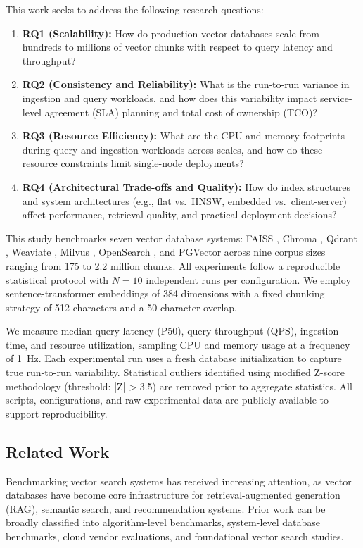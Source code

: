 \documentclass{article}
\begin{document}
This work seeks to address the following research questions:
\begin{enumerate}
    \item \textbf{RQ1 (Scalability):} How do production vector databases scale from hundreds to millions of vector chunks with respect to query latency and throughput?    
    \item \textbf{RQ2 (Consistency and Reliability):} What is the run-to-run variance in ingestion and query workloads, and how does this variability impact service-level agreement (SLA) planning and total cost of ownership (TCO)?    
    \item \textbf{RQ3 (Resource Efficiency):} What are the CPU and memory footprints during query and ingestion workloads across scales, and how do these resource constraints limit single-node deployments?    
    \item \textbf{RQ4 (Architectural Trade-offs and Quality):} How do index structures and system architectures (e.g., flat vs.\ HNSW, embedded vs.\ client-server) affect performance, retrieval quality, and practical deployment decisions?
\end{enumerate}
This study benchmarks seven vector database systems: FAISS \cite{faiss_}, Chroma \cite{chromadb}, Qdrant \cite{qdrant}, Weaviate \cite{weaviate}, Milvus \cite{milvus}, OpenSearch \cite{opensearch}, and PGVector \cite{pgvector} across nine corpus sizes ranging from 175 to 2.2 million chunks. All experiments follow a reproducible statistical protocol with $N = 10$ independent runs per configuration. We employ sentence-transformer embeddings of 384 dimensions with a fixed chunking strategy of 512 characters and a 50-character overlap.

We measure median query latency (P50), query throughput (QPS), ingestion time, and resource utilization, sampling CPU and memory usage at a frequency of 1~Hz. Each experimental run uses a fresh database initialization to capture true run-to-run variability. Statistical outliers identified using modified Z-score methodology (threshold: |Z| > 3.5) are removed prior to aggregate statistics. All scripts, configurations, and raw experimental data are publicly available \cite{kwaai2025benchmark} to support reproducibility.
\subsection{Related Work}
\label{sec:related_work}

Benchmarking vector search systems has received increasing attention, as vector
databases have become core infrastructure for retrieval-augmented generation
(RAG), semantic search, and recommendation systems. Prior work can be broadly
classified into algorithm-level benchmarks, system-level database benchmarks,
cloud vendor evaluations, and foundational vector search studies.
\end{document}
